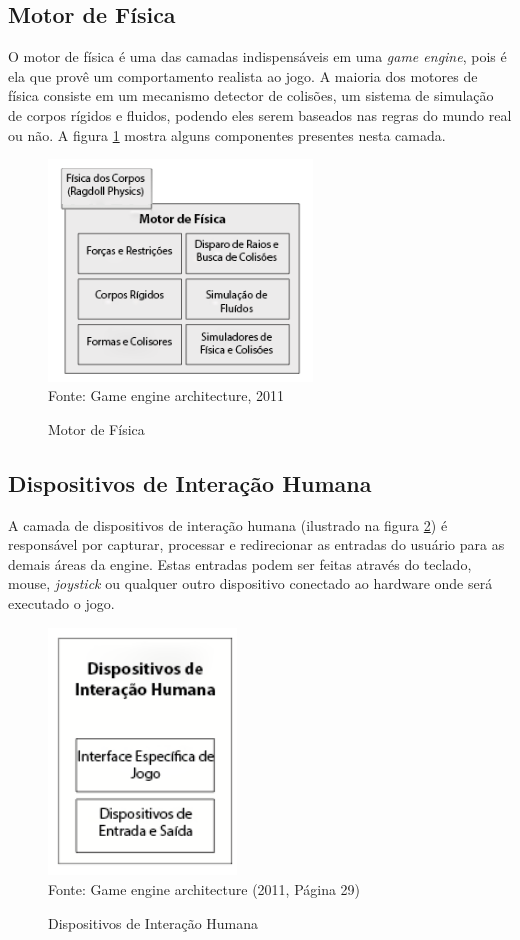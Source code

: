 \documentclass[12pt,	openright, twoside,	a4paper, english, french, spanish, brazil]{abntex2}
\begin{document}
\subsection{Motor de Física}
O motor de física é uma das camadas indispensáveis em uma \textit{game engine}, pois é ela que provê um comportamento realista ao jogo. A maioria dos motores de física consiste em um mecanismo detector de colisões, um sistema de simulação de corpos rígidos e fluidos, podendo eles serem baseados nas regras do mundo real ou não. A figura \ref{figura:arch_phys} mostra alguns componentes presentes nesta camada.

\begin{figure}[H]
\centering
\caption{Motor de Física}
\includegraphics[width=7cm]{imagens/arch-phys.png}
\\
\small{Fonte: Game engine architecture, 2011}
\label{figura:arch_phys}
\end{figure}

\subsection{Dispositivos de Interação Humana}
A camada de dispositivos de interação humana (ilustrado na figura \ref{figura:arch_hid}) é responsável por capturar, processar e redirecionar as entradas do usuário para as demais áreas da engine. Estas entradas podem ser feitas através do teclado, mouse, \textit{joystick} ou qualquer outro dispositivo conectado ao hardware onde será executado o jogo.

\begin{figure}[H]
\centering
\caption{Dispositivos de Interação Humana}
\includegraphics[width=5cm]{imagens/arch-hid.png}
\\
\small{Fonte: Game engine architecture (2011, Página 29)}
\label{figura:arch_hid}
\end{figure}
\end{document}
